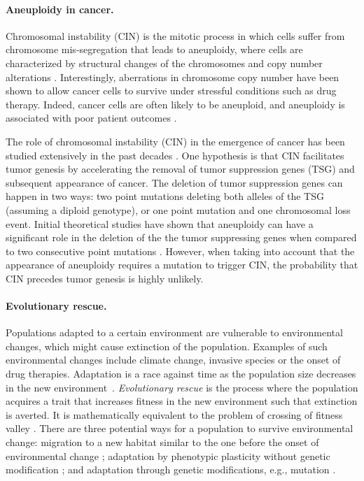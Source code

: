 \documentclass[12pt]{extarticle}
\begin{document}
\paragraph{Aneuploidy in cancer.} Chromosomal instability (CIN) is the mitotic process in which cells suffer from chromosome mis-segregation that leads to aneuploidy, where cells are characterized by structural changes of the chromosomes and copy number alterations \citep{schukken2018cin}.
Interestingly, aberrations in chromosome copy number have been shown to allow cancer cells to survive under stressful conditions such as drug therapy.
Indeed, cancer cells are often likely to be aneuploid, and aneuploidy is associated with poor patient outcomes \citep{ben2020context}.

The role of chromosomal instability (CIN) in the emergence of cancer has been studied extensively in the past decades \citep{michor2005can,christine2018understanding,nowak2002role,pavelka2010dr,komarova2003mutation,zhu2018cellular}.
One hypothesis is that CIN facilitates tumor genesis by accelerating the removal of tumor suppression genes (TSG) and subsequent appearance of cancer. The deletion of tumor suppression genes can happen in two ways: two point mutations deleting both alleles of the TSG (assuming a diploid genotype), or one point mutation and one chromosomal loss event.
Initial theoretical studies have shown that aneuploidy can have a significant role in the deletion of the the tumor suppressing genes when compared to two consecutive point mutations \citep{nowak2002role,komarova2003mutation,michor2005can,komarova2008selective}.
However, when taking into account that the appearance of aneuploidy requires a mutation to trigger CIN, the probability that CIN precedes tumor genesis is highly unlikely.

\paragraph{Evolutionary rescue.} Populations adapted to a certain environment are vulnerable to environmental changes, which might cause extinction of the population. Examples of such environmental changes include climate change, invasive species or the onset of drug therapies. Adaptation is a race against time as the population size decreases in the new environment~\citep{tanaka2022surviving}. 
\emph{Evolutionary rescue} is the process where the population acquires a trait that increases fitness in the new environment such that extinction is averted. It is mathematically equivalent to the problem of crossing of fitness valley \citep{weissman2009rate,weissman2010rate}.
There are three potential ways for a population to survive environmental change: migration to a new habitat similar to the one before the onset of environmental change \citep{cobbold2020should}; adaptation by phenotypic plasticity without genetic modification \citep{carja2019evolutionary,carja2017evolutionary,levien2021non}; and adaptation through genetic modifications, e.g., mutation \citep{uecker2014evolutionary,uecker2016role,uecker2011fixation}.
\end{document}
